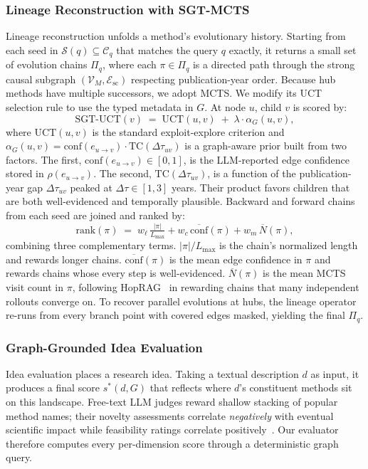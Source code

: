 \documentclass{opendatalab}
\begin{document}
\subsubsection{Lineage Reconstruction with SGT-MCTS}
\label{sec:lineage}
Lineage reconstruction unfolds a method's evolutionary history. Starting from each seed in $\mathcal{S}(q) \subseteq \mathcal{C}_q$ that matches the query $q$ exactly, it returns a small set of evolution chains $\Pi_q$, where each $\pi \in \Pi_q$ is a directed path through the strong causal subgraph $(\mathcal{V}_M, \mathcal{E}_{\text{sc}})$ respecting publication-year order. Because hub methods have multiple successors, we adopt MCTS. We modify its UCT~\cite{kocsis2006bandit} selection rule to use the typed metadata in $G$. At node $u$, child $v$ is scored by:
\begin{equation}
\mathrm{SGT\text{-}UCT}(v) \;=\; \mathrm{UCT}(u, v) \;+\; \lambda \cdot \alpha_G(u, v),
\label{eq:sgt-uct}
\end{equation}
where $\mathrm{UCT}(u, v)$ is the standard exploit-explore criterion and $\alpha_G(u, v) = \mathrm{conf}(e_{u\to v})
\cdot \mathrm{TC}(\Delta\tau_{uv})$ is a graph-aware prior built from two factors. The first, $\mathrm{conf}(e_{u\to
v}) \in [0, 1]$, is the LLM-reported edge confidence stored in $\rho(e_{u\to v})$. The second,
$\mathrm{TC}(\Delta\tau_{uv})$, is a function of the publication-year gap $\Delta\tau_{uv}$ peaked at $\Delta\tau \in
[1, 3]$ years. Their product favors children that are both well-evidenced and temporally plausible. Backward and forward chains from each seed are joined and ranked by:
\begin{equation}
\mathrm{rank}(\pi) \;=\; w_\ell\,\tfrac{|\pi|}{L_{\max}} + w_c\,\overline{\mathrm{conf}}(\pi) +
w_m\,\overline{N}(\pi),
\label{eq:rank}
\end{equation}
combining three complementary terms. $|\pi|/L_{\max}$ is the chain's normalized length and rewards longer chains. $\overline{\mathrm{conf}}(\pi)$ is the mean edge confidence in $\pi$ and rewards chains whose every step is well-evidenced. $\overline{N}(\pi)$ is the mean MCTS visit count in $\pi$, following HopRAG~\cite{liu2025hoprag} in rewarding chains that many independent rollouts converge on. To recover parallel evolutions at hubs, the lineage operator re-runs from every branch point with covered edges masked, yielding
 the final $\Pi_q$.


\subsubsection{Graph-Grounded Idea Evaluation}
\label{sec:eval}
Idea evaluation places a research idea. Taking a textual description $d$ as input, it produces a final score $s^*(d, G)$ that reflects where $d$'s constituent methods sit on this landscape. Free-text LLM judges reward shallow stacking of popular method names; their novelty assessments correlate \emph{negatively} with eventual scientific impact while feasibility ratings correlate positively~\cite{latimer2025hindsight, gu2024generation}. Our evaluator therefore computes every per-dimension score through a deterministic graph query.
\end{document}
